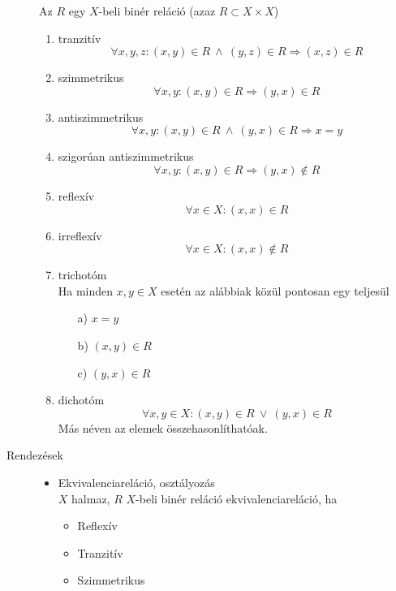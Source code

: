 \documentclass[margin=0px]{article}
\begin{document}
\begin{description}
					Az $R$ egy $X$-beli binér reláció (azaz $R \subset X\times X$)
					\begin{enumerate}
						\item tranzitív \\
							\[\forall x,y,z : (x,y)\in R \ \land \ (y,z) \in R \Longrightarrow (x,z) \in R \]
						\item szimmetrikus \\
							\[\forall x,y : (x,y)\in R \Longrightarrow (y,x) \in R \]
						\item antiszimmetrikus \\
							\[\forall x,y : (x,y)\in R \ \land \ (y,x) \in R \Longrightarrow x = y\]
						\item szigorúan antiszimmetrikus \\
							\[\forall x,y : (x,y)\in R \Longrightarrow (y,x) \notin R\]
						\item reflexív \\
							\[\forall x \in X : (x,x)\in R\]
						\item irreflexív \\
							\[\forall x \in X : (x,x)\notin R\]
						\item trichotóm \\
							Ha minden $x,y \in X$ esetén az alábbiak közül pontosan egy teljesül
							\begin{enumerate}
								\item[a)] $x=y$
								\item[b)] $(x,y) \in R$
								\item[c)] $(y,x) \in R$
							\end{enumerate}
						\item dichotóm \\
							\[\forall x,y \in X : (x,y) \in R \ \lor \ (y,x) \in R\]
							Más néven az elemek összehasonlíthatóak.
					\end{enumerate}
				\item[Rendezések] \hfill
					\begin{itemize}
						\item Ekvivalenciareláció, osztályozás \\
							$X$ halmaz, $R$ $X$-beli binér reláció ekvivalenciareláció, ha
							\begin{itemize}
								\item Reflexív
								\item Tranzitív
								\item Szimmetrikus
							\end{itemize}
							

\end{itemize}
\end{description}
\end{document}
